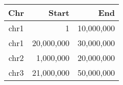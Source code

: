 \begin{tabular}{crr}
  \hline
  Chr & Start & End\\\hline
  chr1 & 1 & 10,000,000\\
  chr1 & 20,000,000 & 30,000,000\\
  chr2 & 1,000,000 & 20,000,000\\
  chr3 & 21,000,000 & 50,000,000\\\hline
\end{tabular}
